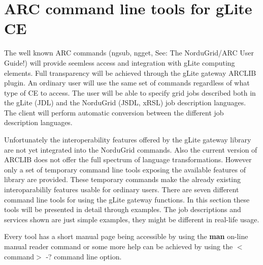 \documentclass{article}
\begin{document}
\section{ARC command line tools for gLite CE}
\label{Users guide}
The well known ARC commands (ngsub, ngget, See: The NorduGrid/ARC User Guide\cite{userguide}!) will provide seemless access and integration with gLite computing elements. Full transparency will be achieved through the gLite gateway ARCLIB plugin. An ordinary user will use the same set of commands regardless of what type of CE to access. The user will be able to specify grid jobs described both in the gLite (JDL) and the NorduGrid (JSDL, xRSL) job description languages. The client will perform automatic conversion between the different job description languages.\par
Unfortunately the interoperability features offered by the gLite gateway library are not yet integrated into the NorduGrid commands. Also the current version of ARCLIB does not offer the full spectrum of language transformations.
However only a set of temporary command line tools exposing the available features of library are provided. These temporary commands make the already existing interoparabilily features usable for ordinary users.
There are seven different command line tools for using the gLite gateway functions. In this section these tools will be presented in detail through examples. The job descriptions and services shown are just simple examples, they might be different in real-life usage.\par
Every tool has a short manual page being accessible by using the \textbf{man} on-line manual reader command or some more help can be achieved by using the $<$command$>$ -? command line option.\par
\end{document}
